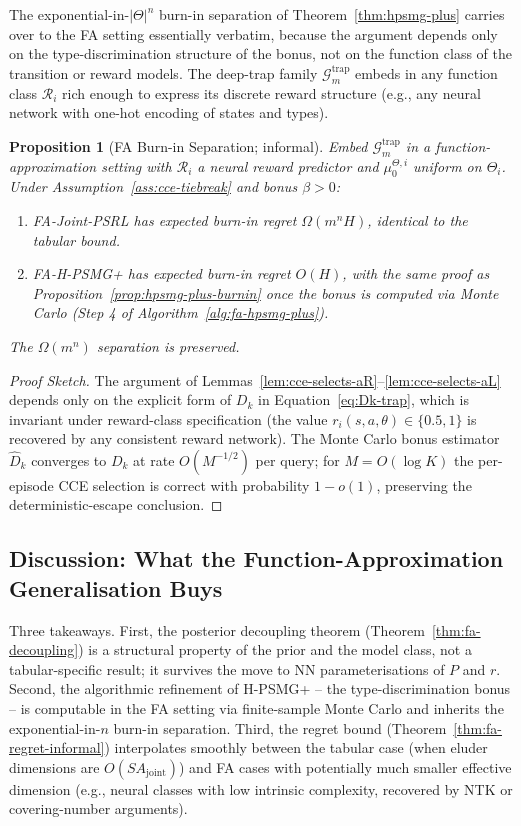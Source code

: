 \documentclass{article}
\newtheorem{proposition}[theorem]{Proposition}
\def\textsuperscript#1{#1}%
\begin{document}
The exponential-in-$|\Theta|^n$ burn-in separation of Theorem~\ref{thm:hpsmg-plus} carries over to the FA setting essentially verbatim, because the argument depends only on the type-discrimination structure of the bonus, not on the function class of the transition or reward models. The deep-trap family $\mathcal{G}_m^{\mathrm{trap}}$ embeds in any function class $\mathcal{R}_i$ rich enough to express its discrete reward structure (e.g., any neural network with one-hot encoding of states and types).

\begin{proposition}[FA Burn-in Separation; informal]
\label{prop:fa-burnin}
Embed $\mathcal{G}_m^{\mathrm{trap}}$ in a function-approximation setting with $\mathcal{R}_i$ a neural reward predictor and $\mu_0^{\Theta, i}$ uniform on $\Theta_i$. Under Assumption~\ref{ass:cce-tiebreak} and bonus $\beta > 0$:
\begin{enumerate}
\item[(i)] FA-Joint-PSRL has expected burn-in regret $\Omega(m^n H)$, identical to the tabular bound.
\item[(ii)] FA-H-PSMG\textsuperscript{+} has expected burn-in regret $O(H)$, with the same proof as Proposition~\ref{prop:hpsmg-plus-burnin} once the bonus is computed via Monte Carlo (Step 4 of Algorithm~\ref{alg:fa-hpsmg-plus}).
\end{enumerate}
The $\Omega(m^n)$ separation is preserved.
\end{proposition}

\begin{proof}[Proof Sketch]
The argument of Lemmas~\ref{lem:cce-selects-aR}--\ref{lem:cce-selects-aL} depends only on the explicit form of $D_k$ in Equation~\eqref{eq:Dk-trap}, which is invariant under reward-class specification (the value $r_i(s, a, \theta) \in \{0.5, 1\}$ is recovered by any consistent reward network). The Monte Carlo bonus estimator $\widehat{D}_k$ converges to $D_k$ at rate $O(M^{-1/2})$ per query; for $M = O(\log K)$ the per-episode CCE selection is correct with probability $1 - o(1)$, preserving the deterministic-escape conclusion.
\end{proof}

\subsection{Discussion: What the Function-Approximation Generalisation Buys}

Three takeaways. First, the posterior decoupling theorem (Theorem~\ref{thm:fa-decoupling}) is a structural property of the prior and the model class, not a tabular-specific result; it survives the move to NN parameterisations of $P$ and $r$. Second, the algorithmic refinement of H-PSMG\textsuperscript{+} -- the type-discrimination bonus -- is computable in the FA setting via finite-sample Monte Carlo and inherits the exponential-in-$n$ burn-in separation. Third, the regret bound (Theorem~\ref{thm:fa-regret-informal}) interpolates smoothly between the tabular case (when eluder dimensions are $O(S A_{\mathrm{joint}})$) and FA cases with potentially much smaller effective dimension (e.g., neural classes with low intrinsic complexity, recovered by NTK or covering-number arguments).
\end{document}
